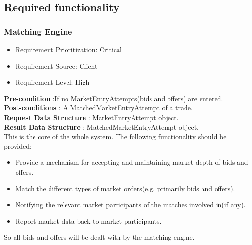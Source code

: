 \documentclass[12pt]{article}
\begin{document}
		\subsection{Required functionality}	
				\subsubsection{Matching Engine}
				\begin{itemize}
					\item Requirement Prioritization: Critical
					\item Requirement Source: Client 	
					\item Requirement Level: High
				\end{itemize}
			 	
				\textbf{Pre-condition} :If no MarketEntryAttempts(bids and offers) are entered.\\
			 	\textbf{Post-conditions} : A MatchedMarketEntryAttempt of a trade.\\ 
			 	\textbf{Request Data Structure} : MarketEntryAttempt object.\\
			 	\textbf{Result Data Structure} : MatchedMarketEntryAttempt object.\\
			 	
				This is the core of the whole system. The following functionality should be provided:
					\begin{itemize}
						\item Provide a mechanism for accepting and maintaining market depth of bids and offers.
						\item Match the different types of market orders(e.g. primarily bids and offers).
						\item Notifying the relevant market participants of the matches involved in(if any).
						\item Report market data back to market participants.
					\end{itemize}
				So all bids and offers will be dealt with by the matching engine.	
				
\end{document}
